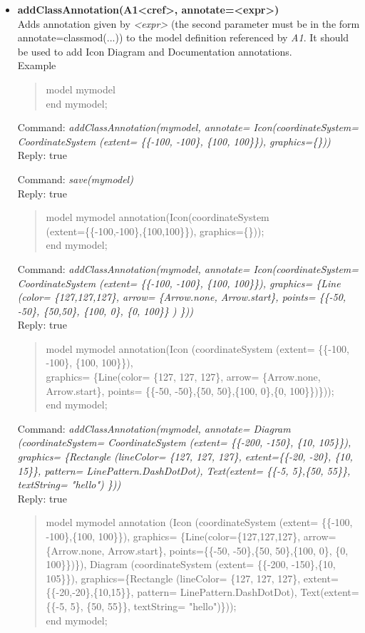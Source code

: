 \documentclass[11pt,a4paper,oneside,english]{book}
\newenvironment{modelicaExamples}{\begin{itemize}}{\end{itemize}}
\newcommand{\api}[2]{\item \textbf{#1} \\ #2}
\newcommand{\tab}{\hspace{2em}}
\newcommand{\command}[1]{Command: \textit{#1}\\}
\newcommand{\reply}[1]{Reply: #1}
\newcommand{\functionex}[2]{\begin{singlespace} \command{#1} \reply{#2} \end{singlespace}}
\newcommand{\examples}{Example}
\newenvironment{mocode}{\begin{verse}\begin{singlespace}\begin{scriptsize}\ttfamily}{\end{scriptsize}\end{singlespace}\end{verse}}
\begin{document}
\begin{modelicaExamples}
{		}
		
		

		\api{addClassAnnotation(A1<cref>, annotate=<expr>)}{Adds annotation given by \textit{<expr>} (the second parameter must be in the form annotate=classmod(...)) to the model definition referenced by \textit{A1}. It should be used to add Icon Diagram and Documentation annotations.\\
		\examples
		\begin{mocode}
		model mymodel\\
		end mymodel;
		\end{mocode}
		\functionex{addClassAnnotation(mymodel, annotate= Icon(coordinateSys\-tem= CoordinateSystem (extent= \{\{-100, -100\}, \{100, 100\}\}), graphics=\{\}))}
		{true}
		
		\functionex{save(mymodel)}
		{true}
		
		\begin{mocode}
		model mymodel annotation(Icon(coordinateSystem\\
\tab (extent=\{\{-100,-100\},\{100,100\}\}), graphics=\{\}));\\
		end mymodel;
		\end{mocode}
		
		\functionex{addClassAnnotation(mymodel, annotate= Icon(coordinateSys\-tem= CoordinateSystem (extent= \{\{-100, -100\}, \{100, 100\}\}), graphics= \{Line (color= \{127,127,127\}, arrow= \{Arrow.none, Arrow.sta\-rt\}, points= \{\{-50, -50\}, \{50,50\}, \{100, 0\}, \{0, 100\}\} ) \}))}
		{true}
		
		\begin{mocode}
		model mymodel annotation(Icon (coordinateSystem (extent= \{\{-100, -100\}, \{100, 100\}\}),\\ 
\tab graphics= \{Line(color= \{127, 127, 127\}, arrow= \{Arrow.none, Arrow.st\-art\}, points= \{\{-50, -50\},\{50, 50\},\{100, 0\},\{0, 100\}\})\}));\\
		end mymodel;
		\end{mocode}
		
		\functionex{addClassAnnotation(mymodel, annotate= Diagram (coordinateSystem= CoordinateSystem (extent= \{\{-200, -150\}, \{10, 105\}\}), graphics= \{Rectangle (lineColor= \{127, 127, 127\}, extent=\{\{-20, -20\}, \{10, 15\}\}, pattern= LinePattern.DashDotDot), Text(extent= \{\{-5, 5\},\{50, 55\}\}, textString= "hello") \}))}
		{true}
		
		\begin{mocode}
		model mymodel
  		annotation (Icon (coordinateSystem (extent= \{\{-100, -100\},\{100, 100\}\}), graphics= \{Line(color=\{127,127,127\}, arrow=\{Arrow.none, Arrow.sta\-rt\}, points=\{\{-50, -50\},\{50, 50\},\{100, 0\}, \{0, 100\}\})\}), Diagram (coordinateSys\-tem (extent= \{\{-200, -150\},\{10, 105\}\}), graphics=\{Rectangle (lineColor= \{127, 127, 127\}, extent=\{\{-20,-20\},\{10,15\}\}, pattern= LinePattern.Dash\-DotDot), Text(extent= \{\{-5, 5\}, \{50, 55\}\}, textString= "hello")\}));\\
		end mymodel;
		\end{mocode}
		
}
\end{modelicaExamples}
\end{document}
